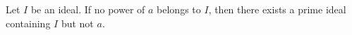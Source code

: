 Let $I$ be an ideal. If no power of $a$ belongs to $I$, then there exists a prime ideal containing $I$ but not $a$.
